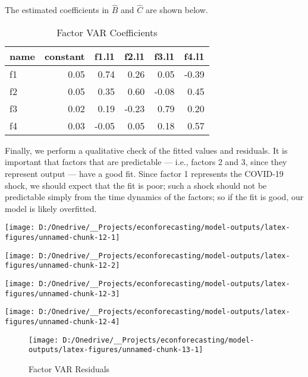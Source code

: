 \documentclass[11pt, letterpaper]{article}\usepackage[]{graphicx}\usepackage[]{color}
\begin{document}
The estimated coefficients in $\widehat{B}$ and $\widehat{C}$ are shown below.
\begin{table}[H]
\centering
\begingroup\footnotesize
\begin{tabular}{lrrrrr}
  \hline
name & constant & f1.l1 & f2.l1 & f3.l1 & f4.l1 \\ 
  \hline
f1 & 0.05 & 0.74 & 0.26 & 0.05 & -0.39 \\ 
  f2 & 0.05 & 0.35 & 0.60 & -0.08 & 0.45 \\ 
  f3 & 0.02 & 0.19 & -0.23 & 0.79 & 0.20 \\ 
  f4 & 0.03 & -0.05 & 0.05 & 0.18 & 0.57 \\ 
   \hline
\end{tabular}
\endgroup
\caption{Factor VAR Coefficients} 
\end{table}



Finally, we perform a qualitative check of the fitted values and residuals. It is important that factors that are predictable --- i.e., factors 2 and 3, since they represent output --- have a good fit. Since factor 1 represents the COVID-19 shock, we should expect that the fit is poor; such a shock should not be predictable simply from the time dynamics of the factors; so if the fit is good, our model is likely overfitted.


{\centering \texttt{[image: D:/Onedrive/\_\_Projects/econforecasting/model-outputs/latex-figures/unnamed-chunk-12-1]} 

}




{\centering \texttt{[image: D:/Onedrive/\_\_Projects/econforecasting/model-outputs/latex-figures/unnamed-chunk-12-2]} 

}




{\centering \texttt{[image: D:/Onedrive/\_\_Projects/econforecasting/model-outputs/latex-figures/unnamed-chunk-12-3]} 

}




{\centering \texttt{[image: D:/Onedrive/\_\_Projects/econforecasting/model-outputs/latex-figures/unnamed-chunk-12-4]} 

}





\begin{figure}[H]

{\centering \texttt{[image: D:/Onedrive/\_\_Projects/econforecasting/model-outputs/latex-figures/unnamed-chunk-13-1]} 

}

\caption[Factor VAR Residuals]{Factor VAR Residuals}\label{fig:unnamed-chunk-13}
\end{figure}
\end{document}
